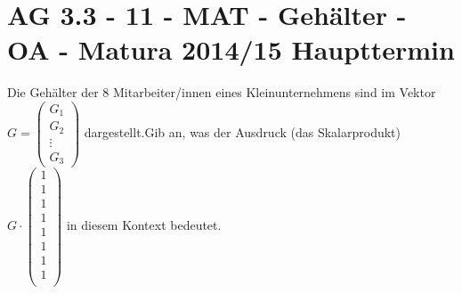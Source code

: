 \section{AG 3.3 - 11 - MAT - Gehälter - OA - Matura 2014/15 Haupttermin}

\begin{beispiel}[AG 3.3]{1} %
Die Gehälter der 8 Mitarbeiter/innen eines Kleinunternehmens sind im Vektor $G=\begin{pmatrix}
	G_1 \\
	G_2 \\
	\vdots \\
	G_3
\end{pmatrix}$ dargestellt.Gib an, was der Ausdruck (das Skalarprodukt) \footnotesize $G\cdot \begin{pmatrix}
	1\\
	1\\
	1\\
	1\\
	1\\
	1\\
	1\\
	1\\
	\end{pmatrix}$ \normalsize in diesem Kontext \mbox{bedeutet}. 


\end{beispiel}